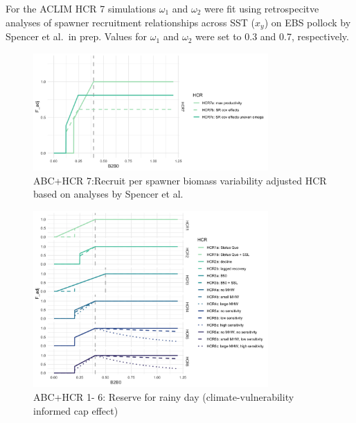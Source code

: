 \documentclass[
]{article}
\begin{document}
For the ACLIM HCR 7 simulations \(\omega_1\) and \(\omega_2\) were fit
using retrospecitve analyses of spawner recruitment relationships across
SST (\(x_y\)) on EBS pollock by Spencer et al.~in prep. Values for
\(\omega_1\) and \(\omega_2\) were set to 0.3 and 0.7, respectively.

\begin{figure}
\centering
\includegraphics[width=0.8\textwidth,height=\textheight]{../../Figs/HCR_figs/HCR7.png}
\caption{ABC+HCR 7:Recruit per spawner biomass variability adjusted HCR
based on analyses by Spencer et al.}
\end{figure}

\begin{figure}
\centering
\includegraphics[width=0.8\textwidth,height=\textheight]{../../Figs/HCR_figs/HCR1TO6.png}
\caption{ABC+HCR 1- 6: Reserve for rainy day (climate-vulnerability
informed cap effect)}
\end{figure}
\end{document}
